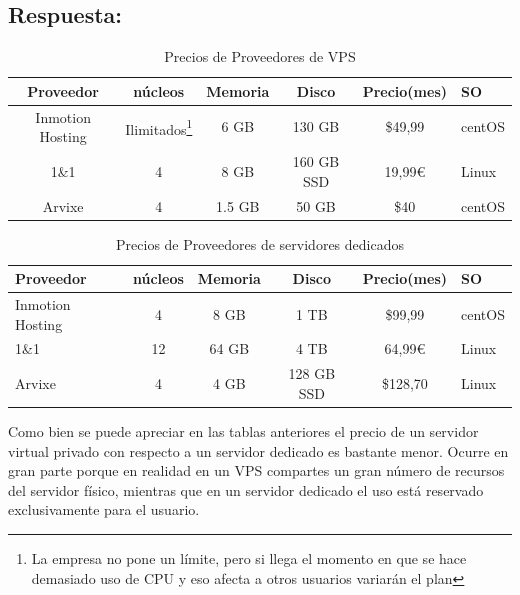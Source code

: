 \subsection{Respuesta:}

\begin{savenotes}
    \begin{table}[H]
	\centering
	\begin{tabular}{|c|c|c|c|c|l|}
	\hline
	\textbf{ Proveedor} & \textbf{núcleos} & \textbf{Memoria} & \textbf{Disco} & \textbf{Precio(mes)} & \textbf{SO} \\
	\hline
	Inmotion Hosting\cite{cuestion2A} & Ilimitados\footnote{La empresa no pone un límite, pero si llega el momento en que se hace demasiado uso de CPU y eso afecta a otros usuarios variarán el plan} & 6 GB & 130 GB & \$49,99 & centOS  \\
	\hline
	1\&1 \cite{cuestion2B} & 4 & 8 GB & 160 GB SSD & 19,99\euro & Linux	 \\
	\hline
	Arvixe\cite{cuestion2C} & 4 & 1.5 GB & 50 GB & \$40 & centOS \\
	\hline
	\end{tabular} 
	\caption{Precios de Proveedores de VPS} \label{tab:tablaProvVPS}
	\end{table}
    \end{savenotes}
    
\begin{table}[H]
\centering
\begin{tabular}{|l|c|c|c|c|l|}
\hline
\textbf{ Proveedor} & \textbf{núcleos} & \textbf{Memoria} & \textbf{Disco} & \textbf{Precio(mes)} & \textbf{SO} \\
\hline
Inmotion Hosting\cite{cuestion2D} & 4 & 8 GB & 1 TB & \$99,99 & centOS \\
\hline
1\&1\cite{cuestion2E} & 12 & 64 GB & 4 TB & 64,99\euro & Linux	 \\
\hline
Arvixe\cite{cuestion2F} & 4 & 4 GB & 128 GB SSD  & \$128,70 & Linux \\
\hline
\end{tabular}  
\caption{Precios de Proveedores de servidores dedicados} \label{tab:tablaProvSD}
\end{table}

Como bien se puede apreciar en las tablas anteriores el precio de un servidor virtual privado con respecto a un servidor dedicado es bastante menor. Ocurre en gran parte porque en realidad en un VPS compartes un gran número de recursos del servidor físico, mientras que en un servidor dedicado el uso está reservado exclusivamente para el usuario.\cite{VPSvsDedInmotion}


